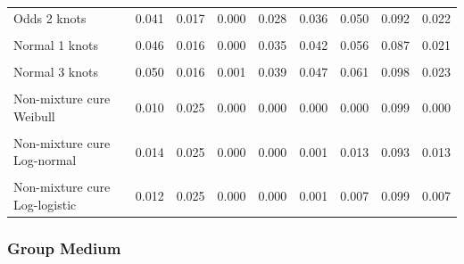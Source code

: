 \documentclass[
]{article}
\begin{document}
\begin{table}[H]
{\begin{tabular}[t]{lrrrrrrrr}
Odds 2 knots & 0.041 & 0.017 & 0.000 & 0.028 & 0.036 & 0.050 & 0.092 & 0.022\\
\cellcolor{gray!10}{Odds 3 knots} & \cellcolor{gray!10}{0.050} & \cellcolor{gray!10}{0.018} & \cellcolor{gray!10}{0.000} & \cellcolor{gray!10}{0.036} & \cellcolor{gray!10}{0.047} & \cellcolor{gray!10}{0.064} & \cellcolor{gray!10}{0.100} & \cellcolor{gray!10}{0.028}\\
Normal 1 knots & 0.046 & 0.016 & 0.000 & 0.035 & 0.042 & 0.056 & 0.087 & 0.021\\
\cellcolor{gray!10}{Normal 2 knots} & \cellcolor{gray!10}{0.040} & \cellcolor{gray!10}{0.017} & \cellcolor{gray!10}{0.000} & \cellcolor{gray!10}{0.028} & \cellcolor{gray!10}{0.035} & \cellcolor{gray!10}{0.048} & \cellcolor{gray!10}{0.095} & \cellcolor{gray!10}{0.019}\\
Normal 3 knots & 0.050 & 0.016 & 0.001 & 0.039 & 0.047 & 0.061 & 0.098 & 0.023\\
\cellcolor{gray!10}{Mixture cure Weibull} & \cellcolor{gray!10}{0.010} & \cellcolor{gray!10}{0.025} & \cellcolor{gray!10}{0.000} & \cellcolor{gray!10}{0.000} & \cellcolor{gray!10}{0.000} & \cellcolor{gray!10}{0.000} & \cellcolor{gray!10}{0.099} & \cellcolor{gray!10}{0.000}\\
Non-mixture cure Weibull & 0.010 & 0.025 & 0.000 & 0.000 & 0.000 & 0.000 & 0.099 & 0.000\\
\cellcolor{gray!10}{Mixture cure Log-normal} & \cellcolor{gray!10}{0.014} & \cellcolor{gray!10}{0.025} & \cellcolor{gray!10}{0.000} & \cellcolor{gray!10}{0.000} & \cellcolor{gray!10}{0.001} & \cellcolor{gray!10}{0.012} & \cellcolor{gray!10}{0.093} & \cellcolor{gray!10}{0.011}\\
Non-mixture cure Log-normal & 0.014 & 0.025 & 0.000 & 0.000 & 0.001 & 0.013 & 0.093 & 0.013\\
\cellcolor{gray!10}{Mixture cure Log-logistic} & \cellcolor{gray!10}{0.012} & \cellcolor{gray!10}{0.025} & \cellcolor{gray!10}{0.000} & \cellcolor{gray!10}{0.000} & \cellcolor{gray!10}{0.001} & \cellcolor{gray!10}{0.007} & \cellcolor{gray!10}{0.099} & \cellcolor{gray!10}{0.007}\\
Non-mixture cure Log-logistic & 0.012 & 0.025 & 0.000 & 0.000 & 0.001 & 0.007 & 0.099 & 0.007\\
\bottomrule
\end{tabular}}
\end{table}

\clearpage

\subsubsection{Group Medium}\label{group-medium}
\end{document}
